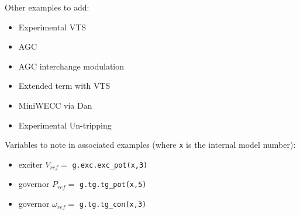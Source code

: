 Other examples to add:
\begin{itemize}
 em
\item Experimental VTS
\item AGC
\item AGC interchange modulation
\item Extended term with VTS
\item MiniWECC via Dan
\item Experimental Un-tripping
\end{itemize}

Variables to note in associated examples (where \verb|x| is the internal model number):
\begin{itemize}
\item exciter $V_{ref} = $ \verb|g.exc.exc_pot(x,3)|
\item governor $P_{ref} = $ \verb|g.tg.tg_pot(x,5)|
\item governor $\omega_{ref} = $ \verb|g.tg.tg_con(x,3)|
\end{itemize}


